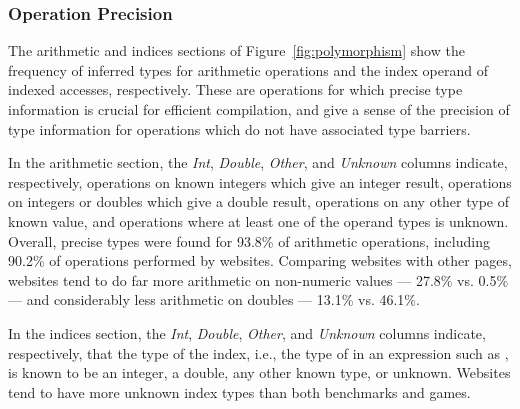 \subsubsection{Operation Precision}
\label{sec:operations}

The arithmetic and indices sections of Figure~\ref{fig:polymorphism} show the frequency
of inferred types for arithmetic operations and the index operand of
indexed accesses, respectively.
These are operations for which precise type information is crucial
for efficient compilation, and give a sense of the precision of type
information for operations which do not have associated type barriers.

In the arithmetic section, the {\it Int}, {\it Double}, {\it Other},
and {\it Unknown} columns indicate,
respectively,
operations on known integers which give an integer result,
operations on integers or doubles which give a double result,
operations on any other type of known value,
and operations where at least one of the operand types is unknown.
Overall, precise types were found for 93.8\% of arithmetic operations,
including 90.2\% of operations performed by websites.
Comparing websites with other pages, websites tend to do far more
arithmetic on non-numeric values --- 27.8\% vs. 0.5\% ---
and considerably less arithmetic on doubles --- 13.1\% vs. 46.1\%.

In the indices section, the {\it Int}, {\it Double}, {\it Other}, and
{\it Unknown} columns indicate, respectively, that the type of the index, i.e.,
the type of  in an expression such as , is known
to be an integer, a double, any other known type, or unknown. Websites tend to
have more unknown index types than both benchmarks and games.

